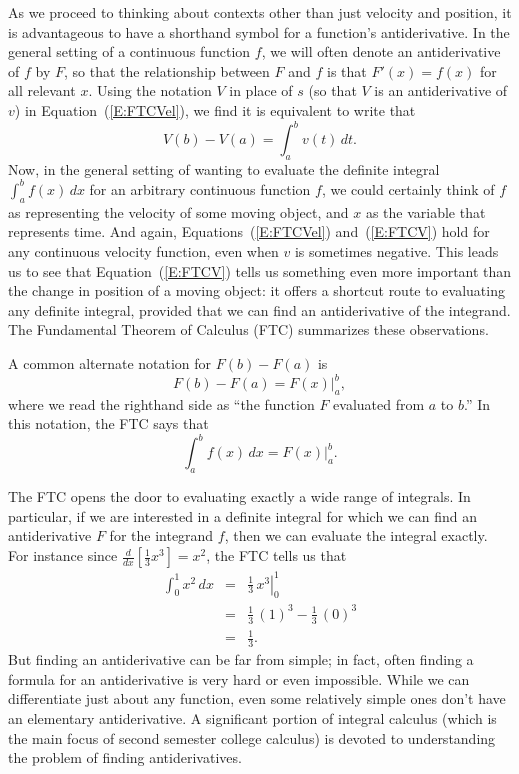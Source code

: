 As we proceed to thinking about contexts other than just velocity and position, it is advantageous to have a shorthand symbol for a function's antiderivative.  In the general setting of a continuous function $f$, we will often denote an antiderivative of $f$ by $F$, so that the relationship between $F$ and $f$ is that $F'(x) = f(x)$ for all relevant $x$.  Using the notation $V$ in place of $s$ (so that $V$ is an antiderivative of $v$) in Equation~(\ref{E:FTCVel}), we find it is equivalent to write that
\begin{equation} \label{E:FTCV}
V(b) - V(a) = \int_a^b v(t) \, dt.
\end{equation}
 Now, in the general setting of wanting to evaluate the definite integral $\int_a^b f(x) \, dx$ for an arbitrary continuous function $f$, we could certainly think of $f$ as representing the velocity of some moving object, and $x$ as the variable that represents time.  And again, Equations~(\ref{E:FTCVel}) and~(\ref{E:FTCV}) hold for any continuous velocity function, even when $v$ is sometimes negative.   This leads us to see that Equation~(\ref{E:FTCV}) tells us something even more important than the change in position of a moving object: it offers a shortcut route to evaluating any definite integral, provided that we can find an antiderivative of the integrand.  The Fundamental Theorem of Calculus (FTC)  summarizes these observations.
 
 \vspace*{5pt}
\nin {}
\vspace*{1pt}

A common alternate notation for $F(b) - F(a)$ is 
$$F(b) - F(a) = \left.  F(x) \right|_a^b,$$
where we read the righthand side as ``the function $F$ evaluated from $a$ to $b$.''  In this notation, the FTC says that
$$\int_a^b f(x) \, dx = \left. F(x) \right|_a^b.$$

The FTC opens the door to evaluating exactly a wide range of integrals.  In particular, if we are interested in a definite integral for which we can find an antiderivative $F$ for the integrand $f$, then we can evaluate the integral exactly.  For instance since $\frac{d}{dx}[\frac{1}{3}x^3] = x^2$, the FTC tells us that
\begin{eqnarray*}
	\int_0^1 x^2 \, dx & = & \left. \frac{1}{3} \, x^3 \right|_0^1 \\
				& = & \frac{1}{3} \, (1)^3 - \frac{1}{3} \, (0)^3 \\
				& = & \frac{1}{3}.
\end{eqnarray*}
But finding an antiderivative can be far from simple; in fact, often finding a formula for an antiderivative is very hard or even impossible.  While we can differentiate just about any function, even some relatively simple ones don't have an elementary antiderivative.  A significant portion of integral calculus (which is the main focus of second semester college calculus) is devoted to understanding the problem of finding antiderivatives.

